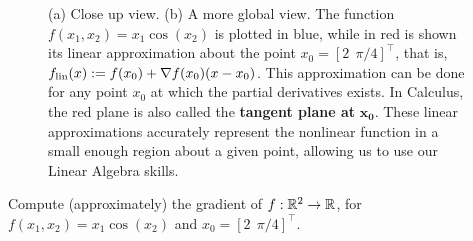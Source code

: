 \vspace*{.2cm}

\begin{figure}[hbt!]
    \centering
    \caption[]{(a) Close up view. (b) A more global view. The function $f(x_1, x_2) = x_1 \cos(x_2)$ is plotted in blue, while in red is shown its linear approximation about the point $x_0=[2~~\pi/4]^\top$, that is,  $f_{\rm lin}(x) :=f(x_0) + \nabla f(x_0) (x-x_0)$. This approximation can be done for any point $x_0$ at which the partial derivatives exists. In Calculus, the red plane is also called the \textbf{tangent plane at} $\mathbf{x_0}$. These linear approximations accurately represent the nonlinear function in a small enough region about a given point, allowing us to use our Linear Algebra skills. 
    }
    \label{fig:VectorLinearApprox}
    \end{figure}

\vspace*{.2cm}

\begin{example} 
\label{ex:GradientPartialDerivative} 
Compute (approximately) the gradient of $f:\mathbb R^2 \to \mathbb R$, for $f(x_1, x_2) = x_1 \cos(x_2)$ and $x_0=[2~~\pi/4]^\top$.
\end{example}

